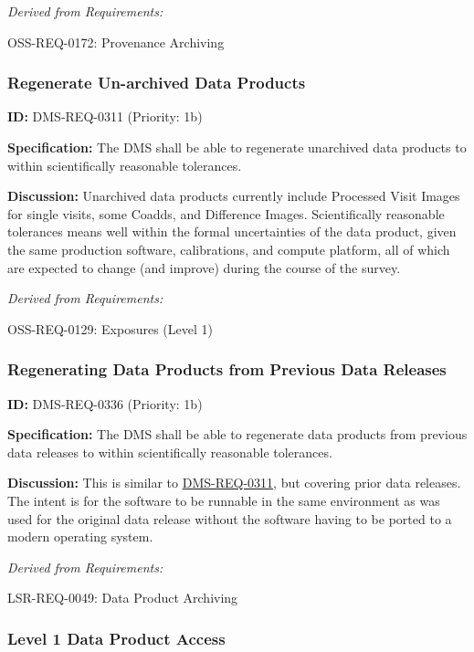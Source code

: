 \documentclass[SE,toc,lsstdraft]{lsstdoc}
\begin{document}
\emph{Derived from Requirements:}

OSS-REQ-0172:
Provenance Archiving \newline

\subsubsection{Regenerate Un-archived Data Products}

\label{DMS-REQ-0311}
\textbf{ID:} DMS-REQ-0311 (Priority: 1b)

\textbf{Specification:} The DMS shall be able to regenerate unarchived data products to within scientifically reasonable tolerances.

\textbf{Discussion: }Unarchived data products currently include Processed Visit Images for single visits, some Coadds, and Difference Images. Scientifically reasonable tolerances means well within the formal uncertainties of the data product, given the same production software, calibrations, and compute platform, all of which are expected to change (and improve) during the course of the survey.

\emph{Derived from Requirements:}

OSS-REQ-0129:
Exposures (Level 1) \newline

\subsubsection{Regenerating Data Products from Previous Data Releases}

\label{DMS-REQ-0336}
\textbf{ID:} DMS-REQ-0336 (Priority: 1b)

\textbf{Specification:} The DMS shall be able to regenerate data products from previous data releases to within scientifically reasonable tolerances.

\textbf{Discussion:} This is similar to \hyperref[DMS-REQ-0311]{DMS-REQ-0311}, but covering prior data releases. The intent is for the software to be runnable in the same environment as was used for the original data release without the software having to be ported to a modern operating system.

\emph{Derived from Requirements:}

LSR-REQ-0049:
Data Product Archiving \newline

\subsubsection{Level 1 Data Product Access}
\end{document}
